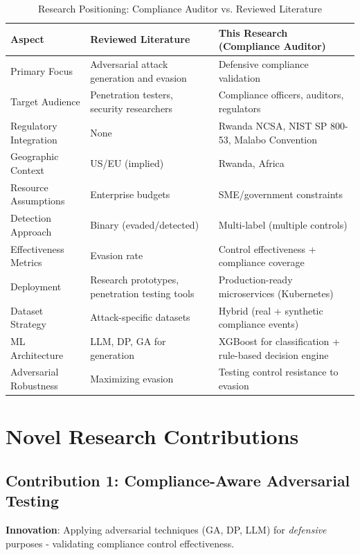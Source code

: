 \documentclass[11pt,conference]{IEEEtran}
\begin{document}
\begin{table}[h]
\centering
\caption{Research Positioning: Compliance Auditor vs. Reviewed Literature}
\begin{tabular}{p{}p{}p{}}
\toprule
\textbf{Aspect} & \textbf{Reviewed Literature} & \textbf{This Research (Compliance Auditor)} \\
\midrule
Primary Focus & Adversarial attack generation and evasion & Defensive compliance validation \\
\midrule
Target Audience & Penetration testers, security researchers & Compliance officers, auditors, regulators \\
\midrule
Regulatory Integration & None & Rwanda NCSA, NIST SP 800-53, Malabo Convention \\
\midrule
Geographic Context & US/EU (implied) & Rwanda, Africa \\
\midrule
Resource Assumptions & Enterprise budgets & SME/government constraints \\
\midrule
Detection Approach & Binary (evaded/detected) & Multi-label (multiple controls) \\
\midrule
Effectiveness Metrics & Evasion rate & Control effectiveness + compliance coverage \\
\midrule
Deployment & Research prototypes, penetration testing tools & Production-ready microservices (Kubernetes) \\
\midrule
Dataset Strategy & Attack-specific datasets & Hybrid (real + synthetic compliance events) \\
\midrule
ML Architecture & LLM, DP, GA for generation & XGBoost for classification + rule-based decision engine \\
\midrule
Adversarial Robustness & Maximizing evasion & Testing control resistance to evasion \\
\midrule
\end{tabular}
\end{table}

\section{Novel Research Contributions}

\subsection{Contribution 1: Compliance-Aware Adversarial Testing}

\textbf{Innovation}: Applying adversarial techniques (GA, DP, LLM) for \textit{defensive} purposes - validating compliance control effectiveness.
\end{document}
